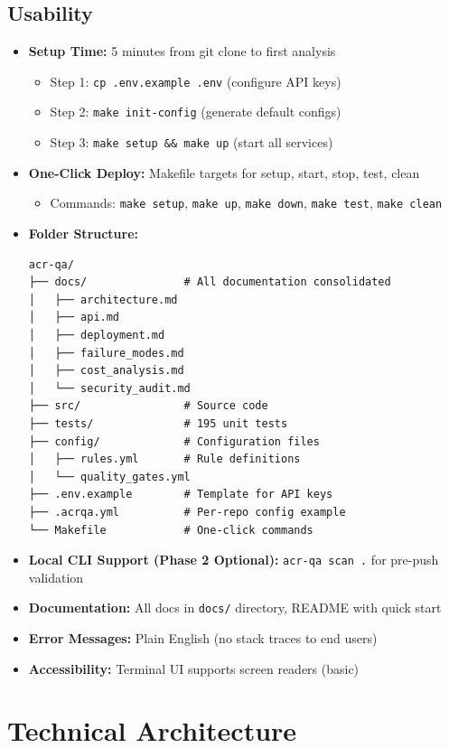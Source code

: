 \documentclass[11pt,a4paper]{article}
\begin{document}
\subsection{Usability}
\begin{itemize}[leftmargin=*]
    \item \textbf{Setup Time:} 5 minutes from git clone to first analysis
    \begin{itemize}
        \item Step 1: \texttt{cp .env.example .env} (configure API keys)
        \item Step 2: \texttt{make init-config} (generate default configs)
        \item Step 3: \texttt{make setup \&\& make up} (start all services)
    \end{itemize}
    \item \textbf{One-Click Deploy:} Makefile targets for setup, start, stop, test, clean
    \begin{itemize}
        \item Commands: \texttt{make setup}, \texttt{make up}, \texttt{make down}, \texttt{make test}, \texttt{make clean}
    \end{itemize}
    \item \textbf{Folder Structure:}
    \begin{verbatim}
acr-qa/
├── docs/               # All documentation consolidated
│   ├── architecture.md
│   ├── api.md
│   ├── deployment.md
│   ├── failure_modes.md
│   ├── cost_analysis.md
│   └── security_audit.md
├── src/                # Source code
├── tests/              # 195 unit tests
├── config/             # Configuration files
│   ├── rules.yml       # Rule definitions
│   └── quality_gates.yml
├── .env.example        # Template for API keys
├── .acrqa.yml          # Per-repo config example
└── Makefile            # One-click commands
    \end{verbatim}
    \item \textbf{Local CLI Support (Phase 2 Optional):} \texttt{acr-qa scan .} for pre-push validation
    \item \textbf{Documentation:} All docs in \texttt{docs/} directory, README with quick start
    \item \textbf{Error Messages:} Plain English (no stack traces to end users)
    \item \textbf{Accessibility:} Terminal UI supports screen readers (basic)
\end{itemize}

\section{Technical Architecture}
\end{document}
